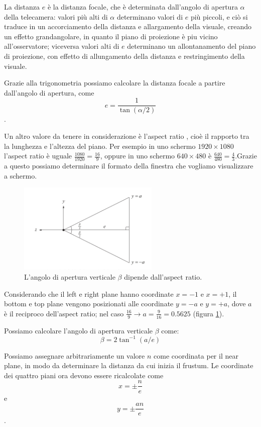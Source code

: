 La distanza $e$ è la distanza focale, che è determinata dall'angolo di apertura $\alpha$ della telecamera: valori più alti di $\alpha$ determinano valori di $e$ più piccoli, e ciò si traduce in un accorciamento della distanza e allargamento della visuale, creando un effetto grandangolare, in quanto il piano di proiezione è piu vicino all'osservatore; viceversa valori alti di $e$ determinano un allontanamento del piano di proiezione, con effetto di allungamento della distanza e restringimento della visuale.

Grazie alla trigonometria possiamo calcolare la distanza focale a partire dall'angolo di apertura, come  $$e = \frac{1}{\tan(\alpha/2)}$$.

Un altro valore da tenere in considerazione è l'aspect ratio , cioè il rapporto tra la lunghezza e l'altezza del piano. Per esempio in uno schermo $1920\times 1080$ l'aspect ratio è uguale $\frac{1080}{1920}=\frac{16}{9}$, oppure in uno schermo $640\times 480$ è $\frac{640}{480}=\frac{4}{3}$.Grazie a questo possiamo determinare il formato della finestra che vogliamo visualizzare a schermo.

\begin{figure}[htbp]
\centering
\includegraphics[width=0.6\textwidth]{images/frustum/frustum-y.png}
\caption{L'angolo di apertura verticale $\beta$ dipende dall'aspect ratio.\label{frustum-y}}
\end{figure}

Considerando che il left e right plane hanno coordinate $x=-1$ e $x=+1$, il bottom e top plane vengono posizionati alle coordinate $y=-a$ e $y=+a$, dove $a$ è il reciproco dell'aspect ratio; nel caso $\frac{16}{9} \rightarrow a=\frac{9}{16}=0.5625$ (figura \ref{frustum-y}).

Possiamo calcolare l'angolo di apertura verticale $\beta$ come: $$\beta=2\tan^{-1}(a/e)$$ 

Possiamo assegnare arbitrariamente un valore $n$ come coordinata per il near plane, in modo da determinare la distanza da cui inizia il frustum. Le coordinate dei quattro piani ora devono essere ricalcolate come $$x =\pm \frac{n}{e}$$ e $$y = \pm \frac{an}{e}$$.



